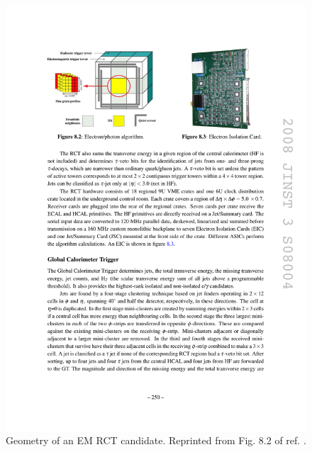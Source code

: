 \documentclass[dissertation.tex]{subfiles}
\begin{document}
\begin{figure}
	\centering
	\includegraphics[scale=1.0]{RCT_EG_candidate}
	\caption{Geometry of an EM RCT candidate.  Reprinted from Fig. 8.2 of ref. \cite{CMS_detector_paper}.}
	\label{fig:RCT_EG_candidate}
\end{figure}
\end{document}
